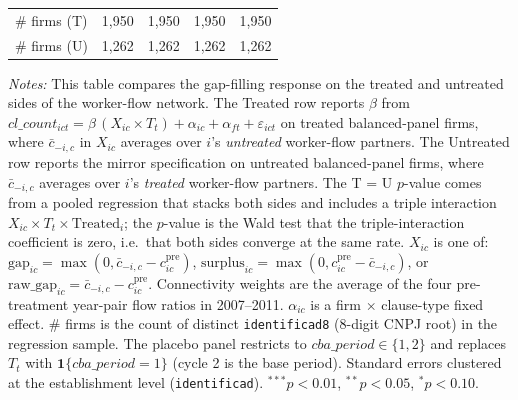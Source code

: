 \begin{table}[H]
\begin{tabular}{lcccc}
\# firms (T) & 1,950 & 1,950 & 1,950 & 1,950 \\
\# firms (U) & 1,262 & 1,262 & 1,262 & 1,262 \\
\bottomrule
\end{tabular}
\begin{minipage}{\linewidth}
\footnotesize\vspace{4pt}
\textit{Notes:} This table compares the gap-filling response on the treated and untreated sides of the worker-flow network. The Treated row reports $\beta$ from $cl\_count_{ict} = \beta\,(X_{ic} \times T_t) + \alpha_{ic} + \alpha_{ft} + \varepsilon_{ict}$ on treated balanced-panel firms, where $\bar c_{-i,c}$ in $X_{ic}$ averages over $i$'s \textit{untreated} worker-flow partners. The Untreated row reports the mirror specification on untreated balanced-panel firms, where $\bar c_{-i,c}$ averages over $i$'s \textit{treated} worker-flow partners. The T = U $p$-value comes from a pooled regression that stacks both sides and includes a triple interaction $X_{ic} \times T_t \times \text{Treated}_i$; the $p$-value is the Wald test that the triple-interaction coefficient is zero, i.e.\ that both sides converge at the same rate. $X_{ic}$ is one of: $\text{gap}_{ic} = \max(0, \bar{c}_{-i,c} - c^{\text{pre}}_{ic})$, $\text{surplus}_{ic} = \max(0, c^{\text{pre}}_{ic} - \bar{c}_{-i,c})$, or $\text{raw\_gap}_{ic} = \bar{c}_{-i,c} - c^{\text{pre}}_{ic}$. Connectivity weights are the average of the four pre-treatment year-pair flow ratios in 2007--2011. $\alpha_{ic}$ is a firm $\times$ clause-type fixed effect. \# firms is the count of distinct \texttt{identificad8} (8-digit CNPJ root) in the regression sample. The placebo panel restricts to $cba\_period \in \{1, 2\}$ and replaces $T_t$ with $\mathbf{1}\{cba\_period = 1\}$ (cycle 2 is the base period). Standard errors clustered at the establishment level (\texttt{identificad}). $^{***}p<0.01$, $^{**}p<0.05$, $^{*}p<0.10$.
\end{minipage}
\end{table}
